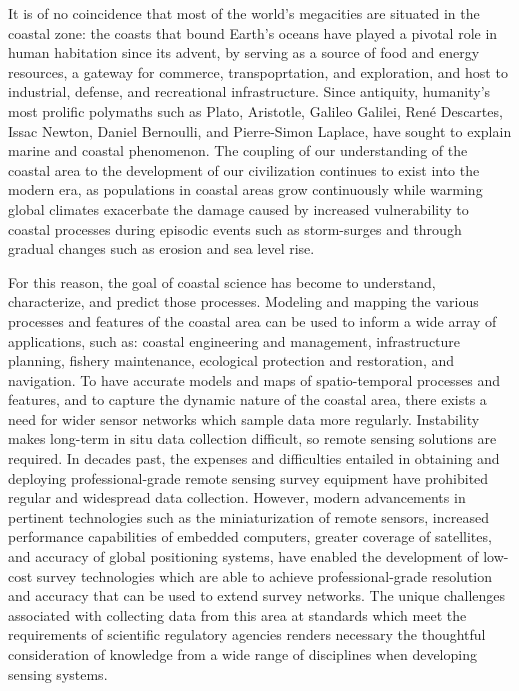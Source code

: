 \documentclass{article}
\begin{document}
\par{It is of no coincidence that most of the world's megacities are situated in the coastal zone: the coasts that bound Earth’s oceans have played a pivotal role in human habitation since its advent, by serving as a source of food and energy resources, a gateway for commerce, transpoprtation, and exploration, and host to industrial, defense, and recreational infrastructure. Since antiquity, humanity's most prolific polymaths such as Plato, Aristotle, Galileo Galilei, René Descartes, Issac Newton, Daniel Bernoulli, and Pierre-Simon Laplace, have sought to explain marine and coastal phenomenon. The coupling of our understanding of the coastal area to the development of our civilization continues to exist into the modern era, as populations in coastal areas grow continuously while warming global climates exacerbate the damage caused by increased vulnerability to coastal processes during episodic events such as storm-surges and through gradual changes such as erosion and sea level rise.}

\par{For this reason, the goal of coastal science has become to understand, characterize, and predict those processes. Modeling and mapping the various processes and features of the coastal area can be used to inform a wide array of applications, such as: coastal engineering and management, infrastructure planning, fishery maintenance, ecological protection and restoration, and navigation. To have accurate models and maps of spatio-temporal processes and features, and to capture the dynamic nature of the coastal area, there exists a need for wider sensor networks which sample data more regularly. Instability makes long-term in situ data collection difficult, so remote sensing solutions are required. In decades past, the expenses and difficulties entailed in obtaining and deploying professional-grade remote sensing survey equipment have prohibited regular and widespread data collection. However, modern advancements in pertinent technologies such as the miniaturization of remote sensors, increased performance capabilities of embedded computers, greater coverage of satellites, and accuracy of global positioning systems, have enabled the development of low-cost survey technologies which are able to achieve professional-grade resolution and accuracy that can be used to extend survey networks. The unique challenges associated with collecting data from this area at standards which meet the requirements of scientific regulatory agencies renders necessary the thoughtful consideration of knowledge from a wide range of disciplines when developing sensing systems.}
\end{document}
